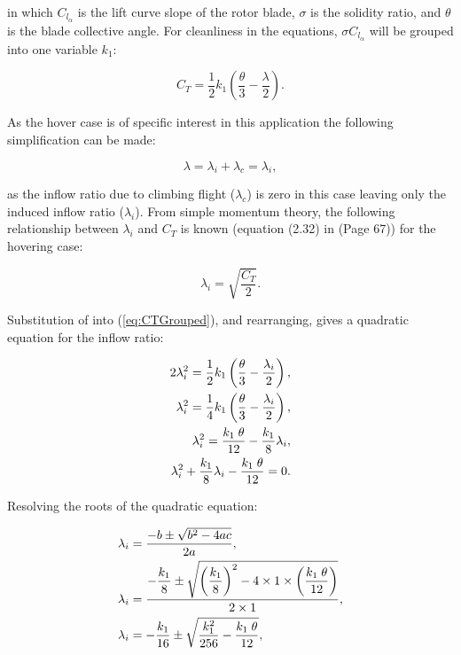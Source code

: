 \documentclass[11pt,a4paper]{article}
\begin{document}
in which $C_{l_{\alpha}}$ is the lift curve slope of the rotor blade, $\sigma$ is the solidity ratio, and $\theta$ is the blade collective angle.  For cleanliness in the equations, $\sigma C_{l_{\alpha}}$ will be grouped into one variable $k_{1}$:

\begin{equation}
	\label{eq:CTGrouped}
	C_{T} = \dfrac{1}{2} k_{1} \left( \dfrac{\theta}{3} - \dfrac{\lambda}{2} \right).
\end{equation}

As the hover case is of specific interest in this application the following simplification can be made:

\begin{equation}
	\label{eq:InflowSimplification}
	\lambda = \lambda_{i} + \lambda_{c} = \lambda_{i},
\end{equation}

as the inflow ratio due to climbing flight ($\lambda_{c}$) is zero in this case leaving only the induced inflow ratio ($\lambda_{i}$).  From simple momentum theory, the following relationship between $\lambda_{i}$ and $C_{T}$ is known (equation (2.32) in \cite{Leishman} (Page 67)) for the hovering case:

\begin{equation}
	\label{eq:InflowCTHover}
	\lambda_{i} = \sqrt{\dfrac{C_{T}}{2}}.
\end{equation}

Substitution of  into (\ref{eq:CTGrouped}), and rearranging, gives a quadratic equation for the inflow ratio:

\begin{alignat}{1}
	2 \lambda_{i}^{2} = \dfrac{1}{2} k_{1} \left( \dfrac{\theta}{3} - \dfrac{\lambda_{i}}{2} \right), \notag \\
	\lambda_{i}^{2} = \dfrac{1}{4} k_{1} \left( \dfrac{\theta}{3} - \dfrac{\lambda_{i}}{2} \right), \notag \\
	\lambda_{i}^{2} = \dfrac{k_{1} \; \theta}{12} - \dfrac{k_{1}}{8} \lambda_{i}, \notag \\
	\lambda_{i}^{2} + \dfrac{k_{1}}{8} \lambda_{i} - \dfrac{k_{1} \; \theta}{12} = 0. \\
\end{alignat}

Resolving the roots of the quadratic equation:

\begin{alignat}{2}
	\lambda_{i} &= \dfrac{-b \pm \sqrt{b^{2} - 4ac}}{2a}, \notag \\
	\lambda_{i} &= \dfrac{-\dfrac{k_{1}}{8} \pm \sqrt{\left(\dfrac{k_{1}}{8}\right)^{2} - 4 \times 1 \times \left( \dfrac{k_{1} \; \theta}{12} \right)}}{2 \times 1}, \notag \\
	\lambda_{i} &= -\dfrac{k_{1}}{16} \pm \sqrt{\dfrac{k_{1}^{2}}{256} - \dfrac{k_{1} \; \theta}{12} }, \notag \\
\end{alignat}
\end{document}
